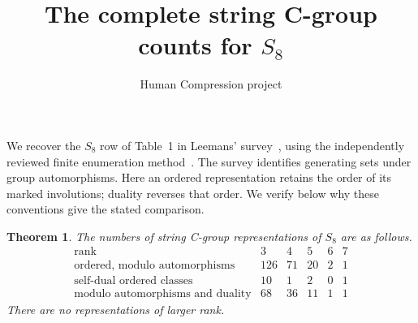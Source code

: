 \documentclass[10pt,a4paper]{article}
\title{The complete string C-group counts for $S_8$}
\author{Human Compression project}\date{}
\newtheorem{theorem}{Theorem}
\begin{document}
\maketitle
We recover the $S_8$ row of Table~1 in Leemans' survey~\cite{survey},
using the independently reviewed finite enumeration method~\cite{method}.
The survey identifies generating sets under group automorphisms.  Here
an ordered representation retains the order of its marked involutions;
duality reverses that order.  We verify below why these conventions give
the stated comparison.

\begin{theorem}
The numbers of string C-group representations of $S_8$ are as follows.
\[
\begin{array}{c|rrrrr}
\text{rank}&3&4&5&6&7\\\hline
\text{ordered, modulo automorphisms}&126&71&20&2&1\\
\text{self-dual ordered classes}&10&1&2&0&1\\
\text{modulo automorphisms and duality}&68&36&11&1&1
\end{array}
\]
There are no representations of larger rank.
\end{theorem}
\end{document}
